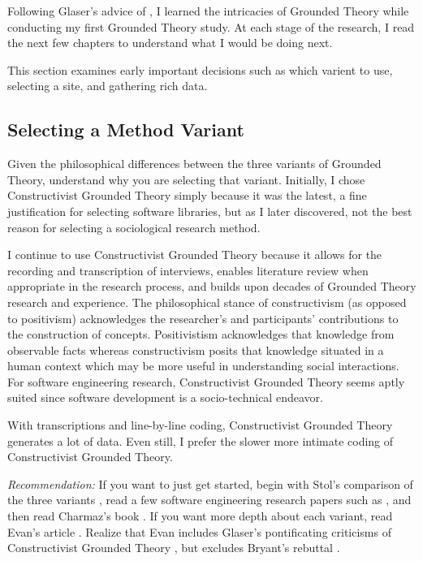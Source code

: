 Following Glaser's advice of  \cite{GlaserIssues}, I learned the intricacies of Grounded Theory while conducting my first Grounded Theory study. At each stage of the research, I read the next few chapters to understand what I would be doing next. 

This section examines early important decisions such as which varient to use, selecting a site, and gathering rich data.
\subsection{Selecting a Method Variant}
Given the philosophical differences between the three variants of Grounded Theory, understand why you are selecting that variant. Initially, I chose Constructivist Grounded Theory simply because it was the latest, a fine justification for selecting software libraries, but as I later discovered, not the best reason for selecting a sociological research method. 

I continue to use Constructivist Grounded Theory because it allows for the recording and transcription of interviews, enables literature review when appropriate in the research process, and builds upon decades of Grounded Theory research and experience. The philosophical stance of constructivism (as opposed to positivism) acknowledges the researcher's and participants' contributions to the construction of concepts. Positivistism acknowledges that knowledge from observable facts whereas constructivism posits that knowledge situated in a human context which may be more useful in understanding social interactions. For software engineering research, Constructivist Grounded Theory seems aptly suited since software development is a socio-technical endeavor.

With transcriptions and line-by-line coding, Constructivist Grounded Theory generates a lot of data. Even still, I prefer the slower more intimate coding of Constructivist Grounded Theory.

\textit{Recommendation:} If you want to just get started, begin with Stol's comparison of the three variants \cite{StolGroundedTheory}, read a few software engineering research papers such as \cite{SedanoSustainableSoftware, SedanoSoftwareDevelopmentWaste}, and then read Charmaz's book \cite{Charmaz}. If you want more depth about each variant, read Evan's article \cite{Evans2013novice}. Realize that Evan includes Glaser's pontificating criticisms of Constructivist Grounded Theory \cite{GlaserConstructivistGroundedTheory}, but excludes Bryant's rebuttal \cite{Bryant2007}. 

